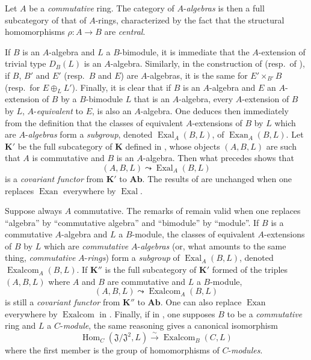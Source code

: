 \begin{env}[18.4.1]
\label{0.18.4.1}
Let $A$ be a \emph{commutative} ring.
The category of $A$-\emph{algebras} is then a full subcategory of that of $A$-rings, characterized by the fact that the structural homomorphisms $\rho:A\to B$ are \emph{central}.

If $B$ is an $A$-algebra and $L$ a $B$-bimodule, it is immediate that the $A$-extension of trivial type $D_B(L)$ is an $A$-algebra.
Similarly, in the construction of  (resp.\ of ), if $B$, $B'$ and $E'$ (resp.\ $B$ and $E$) are $A$-algebras, it is the same for $E'\times_{B'} B$ (resp.\ for $E\oplus_L L'$).
Finally, it is clear that if $B$ is an $A$-algebra and $E$ an $A$-extension of $B$ by a $B$-bimodule $L$ that is an $A$-algebra, every $A$-extension of $B$ by $L$, $A$-\emph{equivalent} to $E$, is also an $A$-algebra.
One deduces then immediately from the definition  that the classes of equivalent $A$-extensions of $B$ by $L$ which are $A$-\emph{algebras} form a \emph{subgroup}, denoted $\operatorname{Exal}_A(B,L)$, of $\operatorname{Exan}_A(B,L)$.
Let $\boldsymbol{K}'$ be the full subcategory of $\boldsymbol{K}$ defined in , whose objects $(A,B,L)$ are such that $A$ is commutative and $B$ is an $A$-algebra.
Then what precedes shows that
\[
  (A,B,L)\leadsto\operatorname{Exal}_A(B,L)
\]
is a \emph{covariant functor} from $\boldsymbol{K}'$ to $\boldsymbol{Ab}$.
The results of  are unchanged when one replaces $\operatorname{Exan}$ everywhere by $\operatorname{Exal}$.
\end{env}

\begin{env}[18.4.2]
\label{0.18.4.2}
Suppose always $A$ commutative.
The remarks of  remain valid when one replaces ``algebra'' by ``commutative algebra'' and ``bimodule'' by ``module''.
If $B$ is a commutative $A$-algebra and $L$ a $B$-module,
the classes of equivalent $A$-extensions of $B$ by $L$ which are \emph{commutative} $A$-\emph{algebras} (or, what amounts to the same thing, \emph{commutative} $A$-\emph{rings}) form a \emph{subgroup} of $\operatorname{Exal}_A(B,L)$, denoted $\operatorname{Exalcom}_A(B,L)$.
If $\boldsymbol{K}''$ is the full subcategory of $\boldsymbol{K}'$ formed of the triples $(A,B,L)$ where $A$ and $B$ are commutative and $L$ a $B$-module,
\[
  (A,B,L)\leadsto\operatorname{Exalcom}_A(B,L)
\]
is still a \emph{covariant functor} from $\boldsymbol{K}''$ to $\boldsymbol{Ab}$.
One can also replace $\operatorname{Exan}$ everywhere by $\operatorname{Exalcom}$ in .
Finally, if in , one supposes $B$ to be a \emph{commutative} ring and $L$ a $C$-\emph{module}, the same reasoning gives a canonical isomorphism
\begin{equation}
\tag{18.4.2.1}
  \label{0.18.4.2.1}
  \operatorname{Hom}_C(\mathfrak{J}/\mathfrak{J}^2,L)\xrightarrow{\sim}\operatorname{Exalcom}_B(C,L)
\end{equation}
where the first member is the group of homomorphisms of $C$-\emph{modules}.
\end{env}

